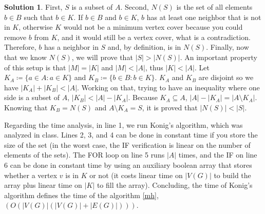 \documentclass[11pt,leqno,final]{amsart}
\theoremstyle{definition}
\newtheorem{solution}{Solution}
\begin{document}
\begin{solution}
  First, $S$ is a subset of $A$. Second, $N(S)$ is the set of all elements $b \in B$ such that $b \in K$. If $b \in B $ and $b \in K$, $b$ has at least one neighbor that is not in $K$, otherwise $K$ would not be a minimum vertex cover because you could remove $b$ from $K$, and it would still be a vertex cover, what is a contradiction. Therefore, $b$ has a neighbor in $S$ and, by definition, is in $N(S)$. Finally, now that we know $N(S)$, we will prove that $|S| > |N (S)|$. An important property of this setup is that $|M| = |K|$ and $|M| < |A|$, thus $|K| < |A|$. Let $K_A \coloneqq \{a \in A: a \in K\}$ and $K_B \coloneqq \{b \in B: b \in K\}$. $K_A$ and $K_B$ are disjoint so we have $|K_A| + |K_B| < |A|$. Working on that, trying to have an inequality where one side is a subset of $A$, $|K_B| < |A| - |K_A|$. Because $K_A \subseteq A$, $|A| - |K_A| = |A \setminus K_A|$. Knowing that $K_B = N(S)$ and $A \setminus K_A = S$, it is proved that $|N (S)| < |S|$.

  Regarding the time analysis, in line 1, we run Konig's algorithm, which was analyzed in class. Lines 2, 3, and 4 can be done in constant time if you store the size of the set (in the worst case, the IF verification is linear on the number of elements of the sets). The FOR loop on line 5 runs  $|A|$ times, and the IF on line 6 can be done in constant time by using an auxiliary boolean array that stores whether a vertex $v$ is in $K$ or not (it costs linear time on $|V(G)|$ to build the array plus linear time on $|K|$ to fill the array). Concluding, the time of Konig's algorithm defines the time of the algorithm \ref{mh}, $(O (|V(G)|(|V(G)| + |E(G)|)))$.






\end{solution}
\end{document}
